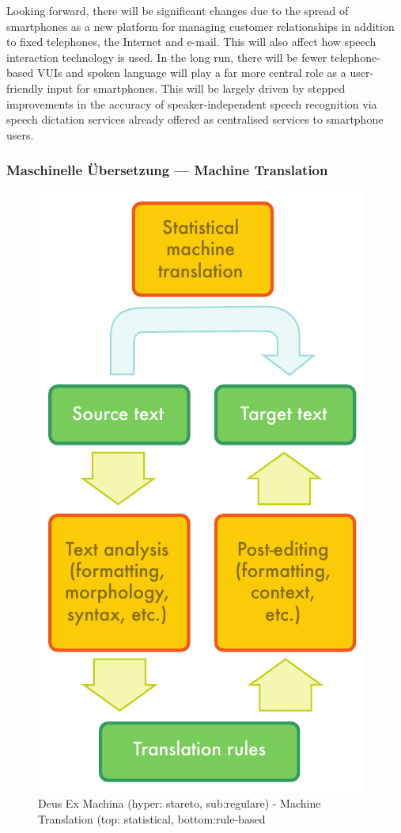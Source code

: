 \documentclass[]{../../metanetpaper}
\begin{document}
\begin{Parallel}[c]{80mm}{80mm}
{    Looking forward, there will be significant changes due to the spread of smartphones as a new platform for managing customer relationships in addition to fixed telephones, the Internet and e-mail. This will also affect how speech interaction technology is used. In the long run, there will be fewer telephone-based VUIs and spoken language will play a far more central role as a user-friendly input for smartphones. This will be largely driven by stepped improvements in the accuracy of speaker-independent speech recognition via speech dictation services already offered as centralised services to smartphone users.
  }
  
  \ParallelPar


  \subsubsection{Maschinelle Übersetzung --- Machine Translation}

\begin{figure}[h!]
\center
\includegraphics[scale=0.7]{../_media/machine_translation}\\
\textsf{Deus Ex Machina (hyper: stareto, sub:regulare) - Machine Translation (top: statistical, bottom:rule-based}
 \end{figure}


\end{Parallel}
\end{document}
